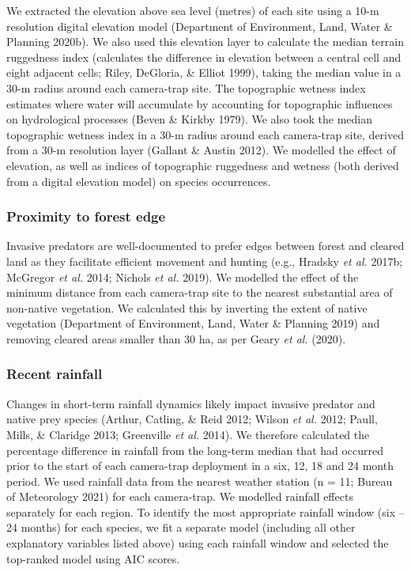 \documentclass[]{elsarticle} %
\begin{document}
We extracted the elevation above sea level (metres) of each site using a 10-m resolution digital elevation model (Department of Environment, Land, Water \& Planning 2020b). We also used this elevation layer to calculate the median terrain ruggedness index (calculates the difference in elevation between a central cell and eight adjacent cells; Riley, DeGloria, \& Elliot 1999), taking the median value in a 30-m radius around each camera-trap site. The topographic wetness index estimates where water will accumulate by accounting for topographic influences on hydrological processes (Beven \& Kirkby 1979). We also took the median topographic wetness index in a 30-m radius around each camera-trap site, derived from a 30-m resolution layer (Gallant \& Austin 2012). We modelled the effect of elevation, as well as indices of topographic ruggedness and wetness (both derived from a digital elevation model) on species occurrences.

\hypertarget{proximity-to-forest-edge}{%
\subsubsection{Proximity to forest edge}\label{proximity-to-forest-edge}}

Invasive predators are well-documented to prefer edges between forest and cleared land as they facilitate efficient movement and hunting (e.g., Hradsky \emph{et al.} 2017b; McGregor \emph{et al.} 2014; Nichols \emph{et al.} 2019). We modelled the effect of the minimum distance from each camera-trap site to the nearest substantial area of non-native vegetation. We calculated this by inverting the extent of native vegetation (Department of Environment, Land, Water \& Planning 2019) and removing cleared areas smaller than 30 ha, as per Geary \emph{et al.} (2020).

\hypertarget{recent-rainfall}{%
\subsubsection{Recent rainfall}\label{recent-rainfall}}

Changes in short-term rainfall dynamics likely impact invasive predator and native prey species (Arthur, Catling, \& Reid 2012; Wilson \emph{et al.} 2012; Paull, Mills, \& Claridge 2013; Greenville \emph{et al.} 2014). We therefore calculated the percentage difference in rainfall from the long-term median that had occurred prior to the start of each camera-trap deployment in a six, 12, 18 and 24 month period. We used rainfall data from the nearest weather station (n = 11; Bureau of Meteorology 2021) for each camera-trap. We modelled rainfall effects separately for each region. To identify the most appropriate rainfall window (six -- 24 months) for each species, we fit a separate model (including all other explanatory variables listed above) using each rainfall window and selected the top-ranked model using AIC scores.
\end{document}
